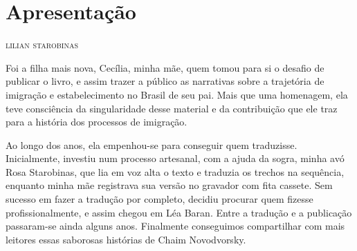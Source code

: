 \chapter*{Apresentação\smallskip{}}

\begin{flushright}
\textsc{lilian starobinas}
\end{flushright}

\noindent{}


Foi a filha mais nova, Cecília, minha mãe, quem tomou para si o desafio
de publicar o livro, e assim trazer a público as narrativas sobre a
trajetória de imigração e estabelecimento no Brasil de seu pai. Mais que
uma homenagem, ela teve consciência da singularidade desse material e da
contribuição que ele traz para a história dos processos de imigração.

Ao longo dos anos, ela empenhou-se para conseguir quem traduzisse.
Inicialmente, investiu num processo artesanal, com a ajuda da sogra,
minha avó Rosa Starobinas, que lia em voz alta o texto e traduzia os
trechos na sequência, enquanto minha mãe registrava sua versão no
gravador com fita cassete. Sem sucesso em fazer a tradução por completo,
decidiu procurar quem fizesse profissionalmente, e assim chegou em Léa
Baran. Entre a tradução e a publicação passaram-se ainda alguns anos.
Finalmente conseguimos compartilhar com mais leitores essas saborosas
histórias de Chaim Novodvorsky.

